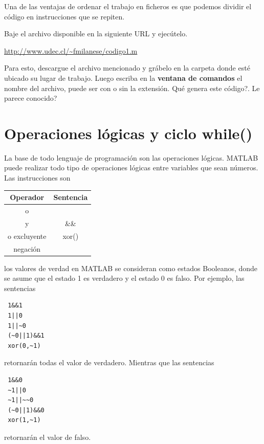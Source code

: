 \documentclass[11pt,legalpaper]{article}
\begin{document}
  Una de las ventajas de ordenar el trabajo en ficheros es que podemos dividir el c\'odigo en instrucciones que se repiten.
  
Baje el archivo disponible en la siguiente URL y ejec\'utelo. \begin{center}
\url{http://www.udec.cl/~fmilanese/codigo1.m}
\end{center} Para esto, descargue el archivo mencionado y gr\'abelo en la carpeta donde   est\'e ubicado su lugar de trabajo. Luego escriba en la \textbf{ventana de comandos} el  nombre del archivo, puede ser con o sin la extensi\'on. 
  \textquestiondown Qu\'e genera este c\'odigo?. \textquestiondown Le parece conocido?

%
\section{Operaciones l\'ogicas y ciclo while()}
La base de todo lenguaje de programaci\'on son las operaciones l\'ogicas. MATLAB puede realizar todo tipo de operaciones 
l\'ogicas entre variables que sean n\'umeros. Las instrucciones son
\begin{center}
  \begin{tabular}{c|c}
  \hline
  Operador 		& Sentencia \\
  \hline
    o				&  \textbar\textbar \\
    y				& 	\&\&\\	
    o excluyente	& xor()\\
    negaci\'on		& \texttildelow
  \end{tabular}
\end{center}
los valores de verdad en MATLAB se consideran como estados Booleanos, donde se asume que el estado 1 es verdadero 
y el estado 0 es falso. Por ejemplo, las sentencias
\begin{lstlisting}
 1&&1
 1||0
 1||~0
 (~0||1)&&1
 xor(0,~1)
\end{lstlisting}
retornar\'an todas el valor de verdadero. Mientras que las sentencias
\begin{lstlisting}
 1&&0
 ~1||0
 ~1||~~0
 (~0||1)&&0
 xor(1,~1)
\end{lstlisting}
retornar\'an el valor de falso.
\end{document}
